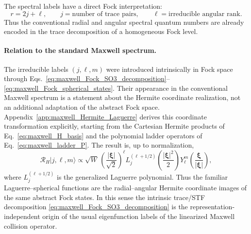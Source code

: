 \documentclass[11pt,oneside]{article}
\numberwithin{equation}{section}
\theoremstyle{definition}
\begin{document}
The spectral labels have a direct Fock interpretation:
\begin{equation}
r=2j+\ell,
\qquad
j=\text{number of trace pairs},
\qquad
\ell=\text{irreducible angular rank}.
\label{eq:maxwell_spectrum_Fock_labels}
\end{equation}
Thus the conventional radial and angular spectral quantum numbers are
already encoded in the trace decomposition of a homogeneous Fock level.

\paragraph{Relation to the standard Maxwell spectrum.}

The irreducible labels $(j,\ell,m)$ were introduced intrinsically in Fock
space through Eqs.~\eqref{eq:maxwell_Fock_SO3_decomposition}--\eqref{eq:maxwell_Fock_spherical_states}.  Their appearance in the conventional
Maxwell spectrum is a statement about the Hermite coordinate realization,
not an additional adaptation of the abstract Fock space.  Appendix~\ref{app:maxwell_Hermite_Laguerre} derives this coordinate transformation explicitly, starting from the Cartesian Hermite products of Eq.~\eqref{eq:maxwell_H_basis} and the polynomial ladder operators of Eq.~\eqref{eq:maxwell_ladder_P}.  The result is, up to normalization,
\begin{equation}
\mathcal R_H|j,\ell,m\rangle
\propto
\sqrt W\,
\left(\frac{|\bm\xi|}{\sqrt2}\right)^\ell
L_j^{(\ell+1/2)}
\left(\frac{|\bm\xi|^2}{2}\right)
Y_\ell^m
\left(
\frac{\bm\xi}{|\bm\xi|}
\right),
\label{eq:maxwell_Fock_to_Laguerre_spherical}
\end{equation}
where $L_j^{(\ell+1/2)}$ is the generalized Laguerre polynomial.  Thus the
familiar Laguerre--spherical functions are the radial--angular Hermite
coordinate images of the same abstract Fock states.  In this sense the
intrinsic trace/STF decomposition
\eqref{eq:maxwell_Fock_SO3_decomposition} is the representation-independent
origin of the usual eigenfunction labels of the linearized Maxwell
collision operator.
\end{document}
